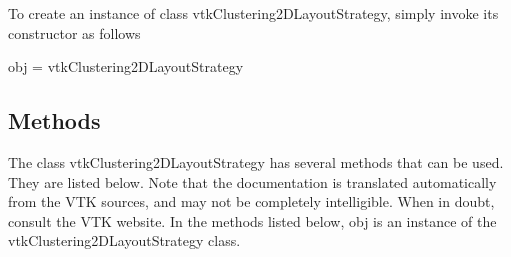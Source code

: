 To create an instance of class vtk\-Clustering2\-D\-Layout\-Strategy, simply invoke its constructor as follows \begin{DoxyVerb}  obj = vtkClustering2DLayoutStrategy
\end{DoxyVerb}
 \hypertarget{vtkwidgets_vtkxyplotwidget_Methods}{}\subsection{Methods}\label{vtkwidgets_vtkxyplotwidget_Methods}
The class vtk\-Clustering2\-D\-Layout\-Strategy has several methods that can be used. They are listed below. Note that the documentation is translated automatically from the V\-T\-K sources, and may not be completely intelligible. When in doubt, consult the V\-T\-K website. In the methods listed below, {\ttfamily obj} is an instance of the vtk\-Clustering2\-D\-Layout\-Strategy class. 
